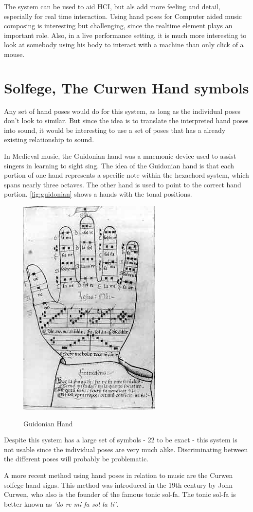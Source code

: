 The system can be used to aid HCI, but als add more feeling and detail, especially for real time interaction. Using hand poses for Computer aided music composing is interesting but challenging, since the realtime element plays an important role. Also, in a live performance setting, it is much more interesting to look at somebody using his body to interact with a machine than only click of a mouse.


\section{Solfege, The Curwen Hand symbols}

Any set of hand poses would do for this system, as long as the individual poses don't look to similar. But since the idea is to translate the interpreted hand poses into sound, it would be interesting to use a set of poses that has a already existing relationship to sound.

In Medieval music, the Guidonian hand was a mnemonic device used to assist singers in learning to sight sing. The idea of the Guidonian hand is that each portion of one hand represents a specific note within the hexachord system, which spans nearly three octaves. The other hand is used to point to the correct hand portion. \autoref{fig:guidonian} shows a hands with the tonal positions.

\begin{figure}[htbp]
	\center{}
	\includegraphics[width=0.3\linewidth]{figures/guidonian_hand.jpg}
	\label{fig:guidonian}
	\caption{Guidonian Hand}
\end{figure}

Despite this system has a large set of symbols - 22 to be exact - this system is not usable since the individual poses are very much alike. Discriminating between the different poses will probably be problematic.

A more recent method using hand poses in relation to music are the Curwen solfege hand signs\cite{choksy1999}. This method was introduced in the 19th century by John Curwen, who also is the founder of the famous tonic sol-fa. The tonic sol-fa is better known as \emph{'do re mi fa sol la ti'}.

